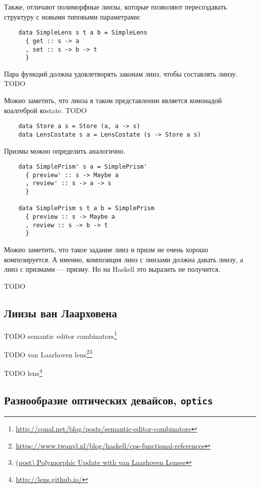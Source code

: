 Также, отличают полиморфные линзы, которые позволяют пересоздавать структуру с новыми типовыми параметрами:
\begin{verbatim}
    data SimpleLens s t a b = SimpleLens
      { get :: s -> a
      , set :: s -> b -> t
      }
\end{verbatim}

Пара функций должна удовлетворять законам линз, чтобы составлять линзу.
TODO %

Можно заметить, что линза в таком представлении является комонадой коалгеброй коstate.
TODO %
\begin{verbatim}
    data Store a s = Store (a, a -> s)
    data LensCostate s a = LensCostate (s -> Store a s)
\end{verbatim}

Призмы можно определить аналогично.
\begin{verbatim}
    data SimplePrism' s a = SimplePrism'
      { preview' :: s -> Maybe a
      , review' :: s -> a -> s
      }

    data SimplePrism s t a b = SimplePrism
      { preview :: s -> Maybe a
      , review :: s -> b -> t
      }
\end{verbatim}

Можно заметить, что такое задание линз и призм не очень хорошо композируется.
А именно, композиция линз с линзами должна давать линзу, а линз с призмами --- призму.
Но на Haskell это выразить не получится.

TODO %

\subsection{Линзы ван Лаарховена}

TODO semantic editor combinators\footnote{\url{http://conal.net/blog/posts/semantic-editor-combinators}} %

TODO van Laarhoven lens\footnote{\url{https://www.twanvl.nl/blog/haskell/cps-functional-references}}\footnote{\href{http://r6.ca/blog/20120623T104901Z.html}{(post) Polymorphic Update with van Laarhoven Lenses}} %

TODO lens\footnote{\url{http://lens.github.io/}} %

\subsection{Разнообразие оптических девайсов, \texttt{optics}}

